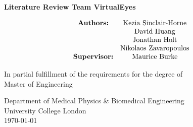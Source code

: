 \begin{titlepage}
    \begin{center}
        \vspace*{1cm}
            
        \huge
        \textbf{Literature Review Team VirtualEyes}
            
        \vspace{0.5cm}
        \Large
        \vspace{1.5cm} \begin{align*}
            \begin{matrix}
                \text{\textbf{Authors:}} & \text{Kezia Sinclair-Horne} \\     
                                         & \text{David Huang} \\
                                         & \text{Jonathan Holt} \\
                                         & \text{Nikolaos Zavaropoulos} \\
                \textbf{Supervisor:} & \text{Maurice Burke} \\
            \end{matrix} \end{align*}

            
        \vfill
            
        In partial fulfillment of the requirements for the degree of \\
        Master of Engineering
            
        \vspace{0.8cm}
            
        \large
        Department of Medical Physics \& Biomedical Engineering\\
        University College London\\
        \today \\
            
    \end{center}
\end{titlepage}